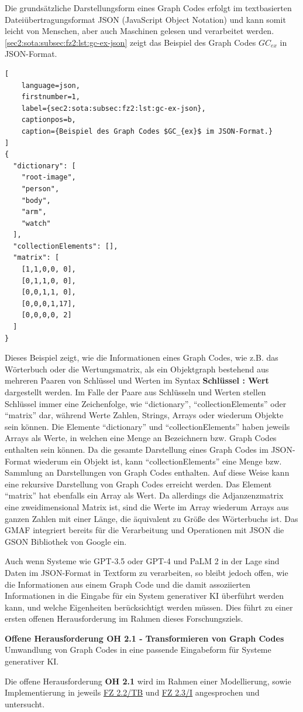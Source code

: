 Die grundsätzliche Darstellungsform eines Graph Codes erfolgt im textbasierten Dateiübertragungsformat JSON (JavaScript Object Notation) und kann somit leicht von Menschen, aber auch Maschinen gelesen und verarbeitet werden.
\cref{sec2:sota:subsec:fz2:lst:gc-ex-json} zeigt das Beispiel des Graph Codes $GC_{ex}$ in JSON-Format.
\begin{lstlisting}[
    language=json,
    firstnumber=1,
    label={sec2:sota:subsec:fz2:lst:gc-ex-json},
    captionpos=b,
    caption={Beispiel des Graph Codes $GC_{ex}$ im JSON-Format.}
]
{
  "dictionary": [
    "root-image",
    "person",
    "body",
    "arm",
    "watch"
  ],
  "collectionElements": [],
  "matrix": [
    [1,1,0,0, 0],
    [0,1,1,0, 0],
    [0,0,1,1, 0],
    [0,0,0,1,17],
    [0,0,0,0, 2]
  ]
}
\end{lstlisting}

Dieses Beispiel zeigt, wie die Informationen eines Graph Codes, wie z.B. das Wörterbuch oder die Wertungsmatrix, als ein Objektgraph bestehend aus mehreren Paaren von Schlüssel und Werten im Syntax \textbf{Schlüssel : Wert} dargestellt werden.
Im Falle der Paare aus Schlüsseln und Werten stellen Schlüssel immer eine Zeichenfolge, wie \enquote{dictionary}, \enquote{collectionElements} oder \enquote{matrix} dar, während Werte Zahlen, Strings, Arrays oder wiederum Objekte sein können.
Die Elemente \enquote{dictionary} und \enquote{collectionElements} haben jeweils Arrays als Werte, in welchen eine Menge an Bezeichnern bzw. Graph Codes enthalten sein können.
Da die gesamte Darstellung eines Graph Codes im JSON-Format wiederum ein Objekt ist, kann \enquote{collectionElements} eine Menge bzw. Sammlung an Darstellungen von Graph Codes enthalten.
Auf diese Weise kann eine rekursive Darstellung von Graph Codes erreicht werden.
Das Element \enquote{matrix} hat ebenfalls ein Array als Wert. 
Da allerdings die Adjanzenzmatrix eine zweidimensional Matrix ist, sind die Werte im Array wiederum Arrays aus ganzen Zahlen mit einer Länge, die äquivalent zu Größe des Wörterbuchs ist.
Das GMAF integriert bereits für die Verarbeitung und Operationen mit JSON die GSON \cite{gson} Bibliothek von Google ein.

Auch wenn Systeme wie GPT-3.5 oder GPT-4 und PaLM 2 in der Lage sind Daten im JSON-Format in Textform zu verarbeiten, so bleibt jedoch offen, wie die Informationen aus einem Graph Code und die damit assoziierten Informationen in die Eingabe für ein System generativer KI überführt werden kann, und welche Eigenheiten berücksichtigt werden müssen.
Dies führt zu einer ersten offenen Herausforderung im Rahmen dieses Forschungsziels.
\begin{tcolorbox}[minipage, colback=white, colframe=black, arc=0pt, outer arc=0pt]
    \textbf{Offene Herausforderung OH 2.1 - Transformieren von Graph Codes} \\
    Umwandlung von Graph Codes in eine passende Eingabeform für Systeme generativer KI.
\end{tcolorbox}
Die offene Herausforderung \textbf{OH 2.1} wird im Rahmen einer Modellierung, sowie Implementierung in jeweils \hyperref[sec3:model:subsec:fz-integration]{FZ 2.2/TB} und \hyperref[sec4:impl:subsec:fz-integration]{FZ 2.3/I} angesprochen und untersucht. 

